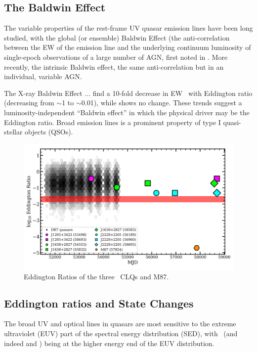 \documentclass[a4paper,fleqn,usenatbib]{mnras}
\begin{document}
\subsection{The Baldwin Effect}
The variable properties of the rest-frame UV quasar emission lines
have been long studied, with the global (or ensemble) Baldwin Effect
(the anti-correlation between the EW of the emission line and the
underlying continuum luminosity of single-epoch observations of a
large number of AGN, first noted in \citet{Baldwin1977}.  More
recently, the intrinsic Baldwin effect, the same anti-correlation but
in an individual, variable AGN.  

The X-ray Baldwin Effect \citep[e.g., ][]{Iwasawa_Taniguchi1993}... 
\citet{Bachev2004} find a 10-fold decrease in EW \civ\ with Eddington
ratio (decreasing from $\sim$1 to $\sim$0.01), while \nv shows no
change. These trends suggest a luminosity-independent ``Baldwin
effect'' in which the physical driver may be the Eddington ratio.
\citet{Ge2016} Broad emission lines is a prominent property of type I quasi-stellar objects (QSOs). 



\begin{figure}
  \centering
  \includegraphics[width=14.5cm, trim=0.2cm 0.2cm 0.0cm 0.2cm, clip]
  {figures/MJD_vs_Eddington_20191104_v0pnt9.png}
  \vspace{-12pt}
  \caption[]{Eddington Ratios of the three \civ\ CLQs and M87.}
  \label{fig:Eddington_ratios}
\end{figure}
\subsection{Eddington ratios and State Changes} 
The broad UV and optical lines in quasars are most sensitive to the
extreme ultraviolet (EUV) part of the spectral energy distribution
(SED), with \civ\ (and indeed \heii and \nv) being at the higher
energy end of the EUV distribution.
\end{document}
